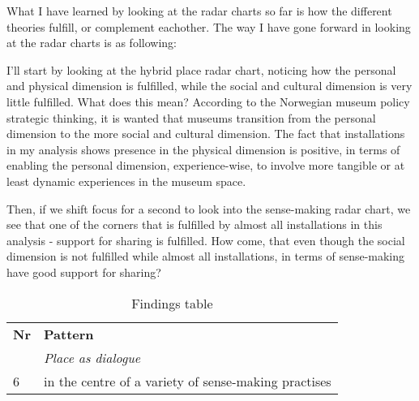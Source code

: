 What I have learned by looking at the radar charts so far is how the different theories fulfill, or complement eachother. The way I have gone forward in looking at the radar charts is as following:
\par I'll start by looking at the hybrid place radar chart, noticing how the personal and physical dimension is fulfilled, while the social and cultural dimension is very little fulfilled. What does this mean? According to the Norwegian museum policy strategic thinking, it is wanted that museums transition from the personal dimension to the more social and cultural dimension. The fact that installations in my analysis shows presence in the physical dimension is positive, in terms of enabling the personal dimension, experience-wise, to involve more tangible or at least dynamic experiences in the museum space.
\par Then, if we shift focus for a second to look into the sense-making radar chart, we see that one of the corners that is fulfilled by almost all installations in this analysis - support for sharing is fulfilled. How come, that even though the social dimension is not fulfilled while almost all installations, in terms of sense-making have good support for sharing? 





\begin{table}[h]
\centering
\begin{tabular}{| p{1cm} | p{11cm}| }
\hline
\textbf{Nr} & \textbf{Pattern} \\
& \textit{Place as dialogue }\\
\hline
6 & in the centre of a variety of sense-making practises \\
\hline

\end{tabular}
\caption{Findings table}
\label{tab:abc}
\end{table}

